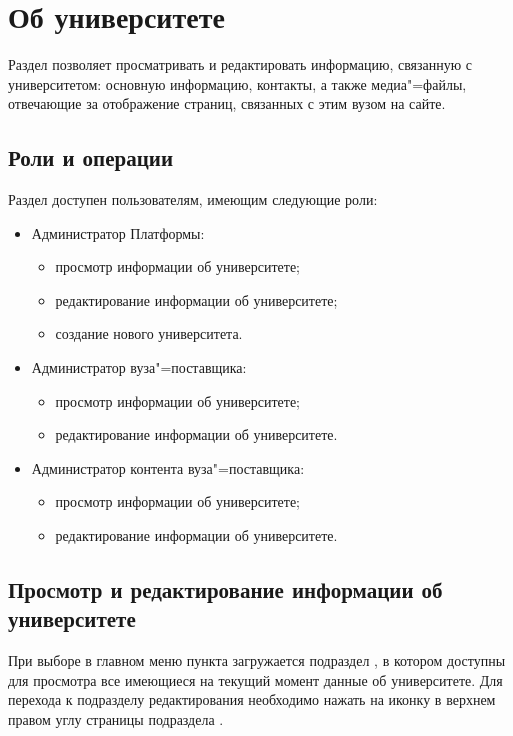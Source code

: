 \graphicspath{{images/university/}}
\section{Об университете}
	Раздел позволяет просматривать и редактировать информацию, связанную с университетом: основную информацию, контакты, а также медиа"=файлы, отвечающие за отображение страниц, связанных с этим вузом на сайте.
	
	\subsection{Роли и операции}
	
	Раздел доступен пользователям, имеющим следующие роли:	

	\begin{itemize}
		\item Администратор Платформы:
		\begin{itemize}
			\item просмотр информации об университете;
			\item редактирование информации об университете;
			\item создание нового университета.
		\end{itemize}
		\item Администратор вуза"=поставщика:
		\begin{itemize}
			\item просмотр информации об университете;
			\item редактирование информации об университете.
		\end{itemize}
		\item Администратор контента вуза"=поставщика:
		\begin{itemize}
			\item просмотр информации об университете;
			\item редактирование информации об университете.
		\end{itemize}
	\end{itemize} 
	
	\subsection{Просмотр и редактирование информации об университете}\label{university:detail_section}
	При выборе в главном меню пункта  загружается подраздел , в котором доступны для просмотра все имеющиеся на текущий момент данные об университете. Для перехода к подразделу редактирования необходимо нажать на иконку   в верхнем правом углу страницы подраздела .

